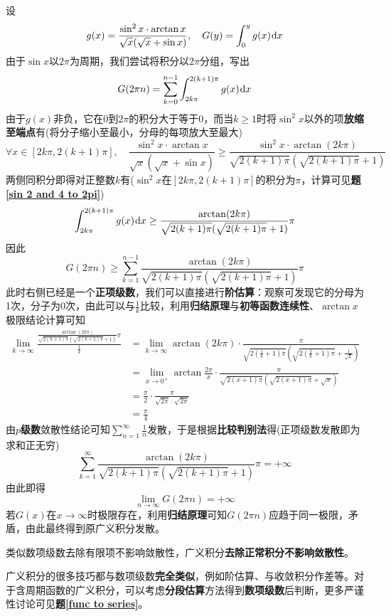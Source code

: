 \documentclass[a4paper,UTF8,fontset=windows,AutoFakeBold]{ctexart}
\newcommand*{\dr}{\hspace{0.07em}\mathrm{d}}
\newcommand*{\suminf}[1][n=1]{\sum_{#1}^\infty}
\newcommand*{\note}{\noindent *}
\theoremstyle{ex}
\newcommand{\exref}[1]{\textbf{题\;\ref{#1}\;}}
\begin{document}
\begin{framed}
{\begin{itemize}
        设
        $$g(x)=\frac{\sin^2x\cdot\arctan x}{\sqrt{x}(\sqrt{x}+\sin x)},\quad G(y)=\int_0^yg(x)\dr x$$
        由于$\sin x$以$2\pi$为周期，我们尝试将积分以$2\pi$分组，写出
        $$G(2\pi n)=\sum_{k=0}^{n-1}\int_{2k\pi}^{2(k+1)\pi}g(x)\dr x$$
        由于$g(x)$非负，它在0到$2\pi$的积分大于等于0，而当$k\ge1$时将$\sin^2x$以外的项\textbf{放缩至端点}有(将分子缩小至最小，分母的每项放大至最大)
        $$\forall x\in[2k\pi,2(k+1)\pi],\quad\frac{\sin^2x\cdot\arctan x}{\sqrt{x}(\sqrt{x}+\sin x)}\ge\frac{\sin^2x\cdot\arctan(2k\pi)}{\sqrt{2(k+1)\pi}(\sqrt{2(k+1)\pi}+1)}$$
        两侧同积分即得对正整数$k$有($\sin^2x$在$[2k\pi,2(k+1)\pi]$的积分为$\pi$，计算可见\exref{sin 2 and 4 to 2pi})
        $$\int_{2k\pi}^{2(k+1)\pi}g(x)\dr x\ge\frac{\arctan(2k\pi)}{\sqrt{2(k+1)\pi}(\sqrt{2(k+1)\pi}+1)}\pi$$
        因此
        $$G(2\pi n)\ge\sum_{k=1}^{n-1}\frac{\arctan(2k\pi)}{\sqrt{2(k+1)\pi}(\sqrt{2(k+1)\pi}+1)}\pi$$
        此时右侧已经是一个\textbf{正项级数}，我们可以直接进行\textbf{阶估算}：观察可发现它的分母为1次，分子为0次，由此可以与$\frac{1}{k}$比较，利用\textbf{归结原理}与\textbf{初等函数连续性}、$\arctan x$极限结论计算可知
        $$\begin{aligned}\lim_{k\to\infty}\frac{\frac{\arctan(2k\pi)}{\sqrt{2(k+1)\pi}(\sqrt{2(k+1)\pi}+1)}\pi}{\frac{1}{k}}&=\lim_{k\to\infty}\arctan(2k\pi)\cdot\frac{\pi}{\sqrt{2(\frac{1}{k}+1)\pi}(\sqrt{2(\frac{1}{k}+1)\pi}+\frac{1}{\sqrt{k}})}\\ &=\lim_{x\to0^+}\arctan\frac{2\pi}{x}\cdot\frac{\pi}{\sqrt{2(x+1)\pi}(\sqrt{2(x+1)\pi}+\sqrt{x})}\\ &=\frac{\pi}{2}\cdot\frac{\pi}{\sqrt{2\pi}\cdot\sqrt{2\pi}}\\ &=\frac{\pi}{4}\end{aligned}$$
        由\textbf{$p$级数}敛散性结论可知$\suminf\frac{1}{n}$发散，于是根据\textbf{比较判别法}得(正项级数发散即为求和正无穷)
        $$\suminf[k=1]\frac{\arctan(2k\pi)}{\sqrt{2(k+1)\pi}(\sqrt{2(k+1)\pi}+1)}\pi=+\infty$$
        由此即得
        $$\lim_{n\to\infty}G(2\pi n)=+\infty$$
        若$G(x)$在$x\to\infty$时极限存在，利用\textbf{归结原理}可知$G(2\pi n)$应趋于同一极限，矛盾，由此最终得到原广义积分发散。
    \end{itemize}
}
\end{framed}

\note 类似数项级数去除有限项不影响敛散性，广义积分\textbf{去除正常积分不影响敛散性}。

\note 广义积分的很多技巧都与数项级数\textbf{完全类似}，例如阶估算、与收敛积分作差等。对于含周期函数的广义积分，可以考虑\textbf{分段估算}方法得到\textbf{数项级数}后判断，更多严谨性讨论可见\exref{func to series}。
\end{document}

